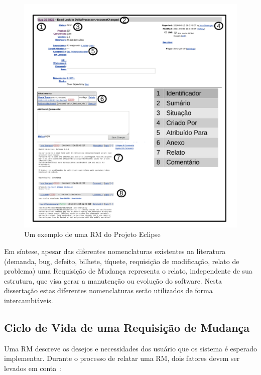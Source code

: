 \begin{figure}[htpb]
	\centering
	\includegraphics[width=0.8\linewidth]{./chapter-manutencao-software-visao-geral/img/rm-exemplo.pdf}
	\caption{Um exemplo de uma RM do Projeto Eclipse}
	\label{fig:rm-exemplo}
\end{figure}
\todoend

Em síntese, apesar das diferentes nomenclaturas existentes na literatura
(demanda, bug, defeito, bilhete, tíquete, requisição de modificação, relato de
problema) uma Requisição de Mudança representa o relato, independente de sua
estrutura, que visa gerar a manutenção ou evolução do software. Nesta
dissertação estas diferentes nomenclaturas serão utilizados de forma
intercambiáveis.

\subsection{Ciclo de Vida de uma Requisição de Mudança}
\label{sub:fluxo_de_trabalho_requisicao_mudanca}

Uma RM descreve os desejos e
necessidades dos usuário que os sistema é esperado implementar. Durante o
processo de relatar uma RM, dois fatores devem ser levados em
conta~\cite{tripathy2014software}:

